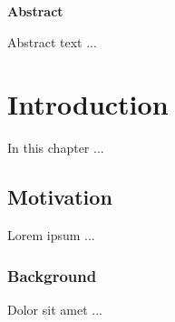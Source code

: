 
\vspace*{5cm} 
\begin{center}
    \textbf{Abstract}
\end{center}

Abstract text ...

\newpage

\tableofcontents

\newpage

\chapter{Introduction}

In this chapter ...

\section{Motivation}

Lorem ipsum ...

\subsection{Background}

Dolor sit amet \cite{lit} ...

\newpage


